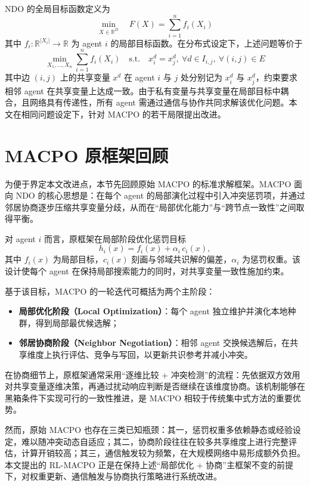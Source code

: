 \documentclass[conference]{IEEEtran}
\begin{document}
NDO 的全局目标函数定义为
\[
\min_{X \in \mathbb{R}^D} \quad F(X) = \sum_{i=1}^{n} f_i(X_i)
\]
其中 \(f_i : \mathbb{R}^{|X_i|} \to \mathbb{R}\) 为 agent \(i\) 的局部目标函数。在分布式设定下，上述问题等价于
\[
\min_{X_1, \ldots, X_n} \sum_{i=1}^{n} f_i(X_i) \quad \text{s.t.} \quad x_i^d = x_j^d,\ \forall d \in I_{i,j},\ \forall (i,j) \in E
\]
其中边 \((i,j)\) 上的共享变量 \(x^d\) 在 agent \(i\) 与 \(j\) 处分别记为 \(x_i^d\) 与 \(x_j^d\)，约束要求相邻 agent 在共享变量上达成一致。由于私有变量与共享变量在局部目标中耦合，且网络具有传递性，所有 agent 需通过通信与协作共同求解该优化问题。本文在相同问题设定下，针对 MACPO 的若干局限提出改进。

\section{MACPO 原框架回顾}\label{sec:macpo_prelim}

为便于界定本文改进点，本节先回顾原始 MACPO 的标准求解框架。MACPO 面向 NDO 的核心思想是：在每个 agent 的局部演化过程中引入冲突惩罚项，并通过邻居协商逐步压缩共享变量分歧，从而在“局部优化能力”与“跨节点一致性”之间取得平衡。

对 agent \(i\) 而言，原框架在局部阶段优化惩罚目标
\[
h_i(x)=f_i(x)+\alpha_i\,c_i(x),
\]
其中 \(f_i(x)\) 为局部目标，\(c_i(x)\) 刻画与邻域共识解的偏差，\(\alpha_i\) 为惩罚权重。该设计使每个 agent 在保持局部搜索能力的同时，对共享变量一致性施加约束。

基于该目标，MACPO 的一轮迭代可概括为两个主阶段：
\begin{itemize}
\item \textbf{局部优化阶段（Local Optimization）}：每个 agent 独立维护并演化本地种群，得到局部最优候选解；
\item \textbf{邻居协商阶段（Neighbor Negotiation）}：相邻 agent 交换候选解后，在共享维度上执行评估、竞争与写回，以更新共识参考并减小冲突。
\end{itemize}

在协商细节上，原框架通常采用“逐维比较 + 冲突检测”的流程：先依据双方效用对共享变量逐维决策，再通过扰动响应判断是否继续在该维度协商。该机制能够在黑箱条件下实现可行的一致性推进，是 MACPO 相较于传统集中式方法的重要优势。

然而，原始 MACPO 也存在三类已知瓶颈：其一，惩罚权重多依赖静态或经验设定，难以随冲突动态自适应；其二，协商阶段往往在较多共享维度上进行完整评估，计算开销较高；其三，通信触发较为频繁，在大规模网络中易形成额外负担。本文提出的 RL-MACPO 正是在保持上述“局部优化 + 协商”主框架不变的前提下，对权重更新、通信触发与协商执行策略进行系统改进。
\end{document}
